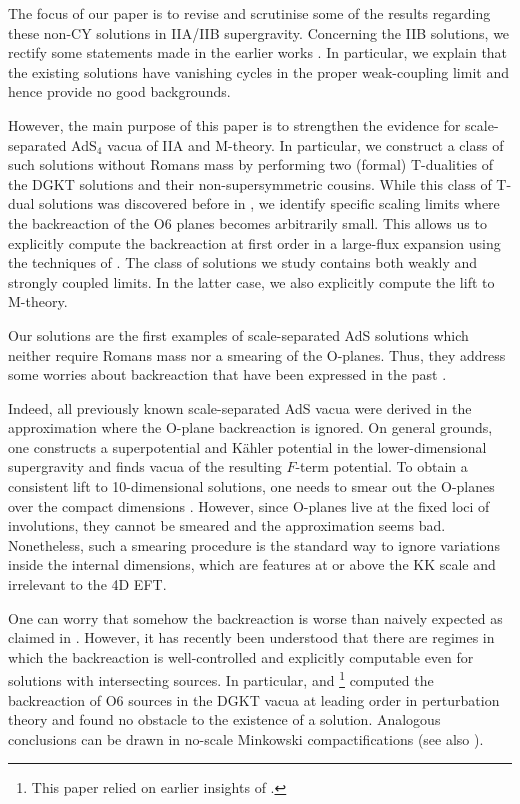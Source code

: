 \documentclass[11pt]{article}
\renewcommand{\[}{\left[}
\renewcommand{\]}{\right]}
\renewcommand{\(}{\left(}
\renewcommand{\)}{\right)}
\newcommand{\<}{\langle}
\renewcommand{\>}{\rangle}
\begin{document}
The focus of our paper is to revise and scrutinise some of the results regarding these non-CY solutions in IIA/IIB supergravity.
Concerning the IIB solutions, we rectify some statements made in the earlier works \cite{Caviezel:2009tu, Petrini:2013ika}. In particular, we explain that the existing solutions have vanishing cycles in the proper weak-coupling limit and hence provide no good backgrounds.

However, the main purpose of this paper is to strengthen the evidence for scale-separated AdS$_4$ vacua of IIA and M-theory. In particular, we construct a class of such solutions without Romans mass by performing two (formal) T-dualities of the DGKT solutions and their non-supersymmetric cousins. While this class of T-dual solutions was discovered before in \cite{Caviezel:2008ik}, we identify specific scaling limits where the backreaction of the O6 planes becomes arbitrarily small. This allows us to explicitly compute the backreaction at first order in a large-flux expansion using the techniques of \cite{Junghans:2020acz}. The class of solutions we study contains both weakly and strongly coupled limits. In the latter case, we also explicitly compute the lift to M-theory.

Our solutions are the first examples of scale-separated AdS solutions which neither require Romans mass nor a smearing of the O-planes. Thus, they address some worries about backreaction that have been expressed in the past \cite{Banks:2006hg, McOrist:2012yc}. 

Indeed, all previously known scale-separated AdS vacua were derived in the approximation where the O-plane backreaction is ignored. On general grounds, one constructs a superpotential and K\"ahler potential in the lower-dimensional supergravity and finds vacua of the resulting $F$-term potential. To obtain a consistent lift to 10-dimensional solutions, one needs to smear out the O-planes over the compact dimensions \cite{Acharya:2006ne, Grana:2006kf}. However, since O-planes live at the fixed loci of involutions, they cannot be smeared and the approximation seems bad. Nonetheless, such a smearing procedure is the standard way to ignore variations inside the internal dimensions, which are features at or above the KK scale and irrelevant to the 4D EFT.

One can worry that somehow the backreaction is worse than naively expected as claimed in \cite{Banks:2006hg, McOrist:2012yc}. However, it has recently been understood that there are regimes in which the backreaction is well-controlled and explicitly computable even for solutions with intersecting sources. In particular, \cite{Junghans:2020acz} and \cite{Marchesano:2020qvg}\footnote{This paper relied on earlier insights of \cite{Saracco:2012wc}.} computed the backreaction of O6 sources in the DGKT vacua at leading order in perturbation theory and found no obstacle to the existence of a solution. Analogous conclusions can be drawn in no-scale Minkowski compactifications \cite{Baines:2020dmu} (see also \cite{Blaback:2010sj}).
\end{document}
